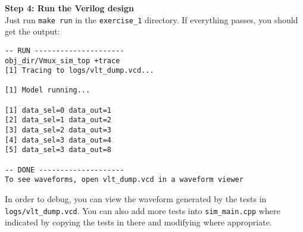 \documentclass{article}
\begin{document}
\noindent\textbf{Step 4: Run the Verilog design}\\
Just run \texttt{make run} in the \texttt{exercise\_1} directory. If everything
passes, you should get the output:

\begin{verbatim}
-- RUN ---------------------
obj_dir/Vmux_sim_top +trace
[1] Tracing to logs/vlt_dump.vcd...

[1] Model running...

[1] data_sel=0 data_out=1
[2] data_sel=1 data_out=2
[3] data_sel=2 data_out=3
[4] data_sel=3 data_out=4
[5] data_sel=3 data_out=8

-- DONE --------------------
To see waveforms, open vlt_dump.vcd in a waveform viewer
\end{verbatim}

In order to debug, you can view the waveform generated by the tests in
\texttt{logs/vlt\_dump.vcd}. You can also add more tests into
\texttt{sim\_main.cpp} where indicated by copying the tests in there and
modifying where appropriate.
\end{document}
